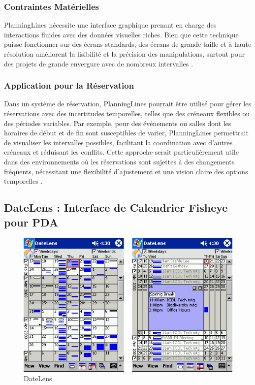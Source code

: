 \documentclass[runningheads]{llncs}
\begin{document}
\subsubsection{Contraintes Matérielles}
PlanningLines nécessite une interface graphique prenant en charge des interactions fluides avec des données visuelles riches. Bien que cette technique puisse fonctionner sur des écrans standards, des écrans de grande taille et à haute résolution améliorent la lisibilité et la précision des manipulations, surtout pour des projets de grande envergure avec de nombreux intervalles \cite{aigner_planninglines_2005}.

\subsubsection{Application pour la Réservation}
Dans un système de réservation, PlanningLines pourrait être utilisé pour gérer les réservations avec des incertitudes temporelles, telles que des créneaux flexibles ou des périodes variables. Par exemple, pour des événements ou salles dont les horaires de début et de fin sont susceptibles de varier, PlanningLines permettrait de visualiser les intervalles possibles, facilitant la coordination avec d’autres créneaux et réduisant les conflits. Cette approche serait particulièrement utile dans des environnements où les réservations sont sujettes à des changements fréquents, nécessitant une flexibilité d’ajustement et une vision claire des options temporelles \cite{aigner_planninglines_2005}.

\subsection{DateLens : Interface de Calendrier Fisheye pour PDA}
\begin{figure}
    \centering
    \includegraphics[width=1\linewidth]{assets/datelens.png}
    \caption{DateLens \cite{bederson_datelens_2004}}
    \label{fig:enter-label}
\end{figure}
\end{document}
